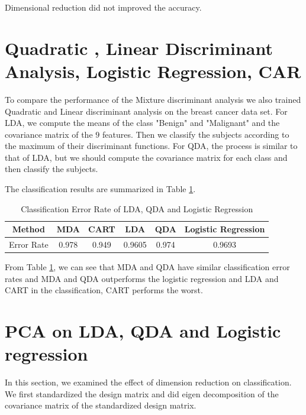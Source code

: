 \documentclass[12pt]{article}
\begin{document}
Dimensional reduction did not improved the accuracy.

\section{Quadratic , Linear Discriminant Analysis, Logistic Regression, CAR}

To compare the performance of the Mixture discriminant analysis we also trained Quadratic and Linear discriminant analysis on the breast cancer data set.  For LDA, we compute the means of the class "Benign" and "Malignant" and the covariance matrix of the $9$ features. Then we classify the subjects according to the maximum of their discriminant functions. For QDA, the process is similar to that of LDA, but we should compute the covariance matrix for each class and then classify the subjects.

The classification results are summarized in Table \ref{tab1}.

\begin{table}[htbp]
\begin{center}
\caption{\label{tab1} Classification Error Rate of LDA, QDA and Logistic Regression}
\begin{tabular}{c|ccccc}
				\hline
Method&MDA&CART&LDA &QDA &Logistic Regression \\
				\hline
Error Rate& 0.978  &0.949&0.9605&0.974&0.9693  \\
				\hline
\end{tabular}
\end{center}
\end{table}


From Table \ref{tab1}, we can see that MDA and QDA have similar classification error rates and MDA and QDA outperforms the logistic regression and LDA and CART in the classification, CART performs the worst.


\section{PCA on LDA, QDA and Logistic regression}
In this section, we examined the effect of dimension reduction on classification. We first standardized the design matrix and did eigen decomposition of the covariance matrix of the standardized design matrix.
\end{document}
